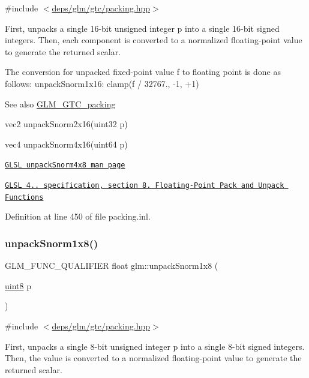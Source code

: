 {\ttfamily \#include $<$\hyperlink{gtc_2packing_8hpp}{deps/glm/gtc/packing.\+hpp}$>$}

First, unpacks a single 16-\/bit unsigned integer p into a single 16-\/bit signed integers. Then, each component is converted to a normalized floating-\/point value to generate the returned scalar.

The conversion for unpacked fixed-\/point value f to floating point is done as follows\+: unpack\+Snorm1x16\+: clamp(f / 32767., -\/1, +1)

\begin{DoxySeeAlso}{See also}
\hyperlink{group__gtc__packing}{G\+L\+M\+\_\+\+G\+T\+C\+\_\+packing} 

vec2 unpack\+Snorm2x16(uint32 p) 

vec4 unpack\+Snorm4x16(uint64 p) 

\href{http://www.opengl.org/sdk/docs/manglsl/xhtml/unpackSnorm1x16.xml}{\tt G\+L\+SL unpack\+Snorm4x8 man page} 

\href{http://www.opengl.org/registry/doc/GLSLangSpec.4.20.8.pdf}{\tt G\+L\+SL 4.. specification, section 8. Floating-\/\+Point Pack and Unpack Functions} 
\end{DoxySeeAlso}


Definition at line 450 of file packing.\+inl.

\mbox{\label{group__gtc__packing_ga6f2bebf536fbf7c8b97d4b306bb3354e}} 
\subsubsection{\texorpdfstring{unpack\+Snorm1x8()}{unpackSnorm1x8()}}
{\footnotesize\ttfamily G\+L\+M\+\_\+\+F\+U\+N\+C\+\_\+\+Q\+U\+A\+L\+I\+F\+I\+ER float glm\+::unpack\+Snorm1x8 (\begin{DoxyParamCaption}\item[{\hyperlink{group__gtc__type__precision_ga1a7dcd8aac97cc8020817c94049deff2}{uint8}}]{p }\end{DoxyParamCaption})}



{\ttfamily \#include $<$\hyperlink{gtc_2packing_8hpp}{deps/glm/gtc/packing.\+hpp}$>$}

First, unpacks a single 8-\/bit unsigned integer p into a single 8-\/bit signed integers. Then, the value is converted to a normalized floating-\/point value to generate the returned scalar.

